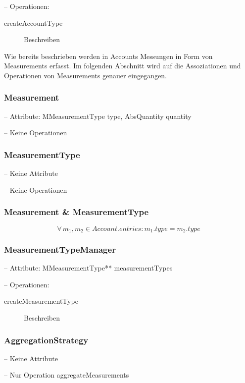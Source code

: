 -- Operationen:

\begin{description}
	\item[createAccountType] Beschreiben
\end{description}

Wie bereits beschrieben werden in Accounts Messungen in Form von Measurements erfasst. 
Im folgenden Abschnitt wird auf die Assoziationen und Operationen von Measurements genauer eingegangen.


\subsubsection{Measurement}


-- Attribute: MMeasurementType type, AbsQuantity quantity

-- Keine Operationen


\subsubsection{MeasurementType}


-- Keine Attribute

-- Keine Operationen


\subsubsection{Measurement \& MeasurementType}

\begin{equation} \forall \, m_1, m_2 \in Account.entries: m_1.type = m_2.type
\end{equation}


\subsubsection{MeasurementTypeManager}


-- Attribute: MMeasurementType** measurementTypes

-- Operationen:

\begin{description}
	\item[createMeasurementType] Beschreiben
\end{description}


\subsubsection{AggregationStrategy}


-- Keine Attribute

-- Nur Operation aggregateMeasurements



